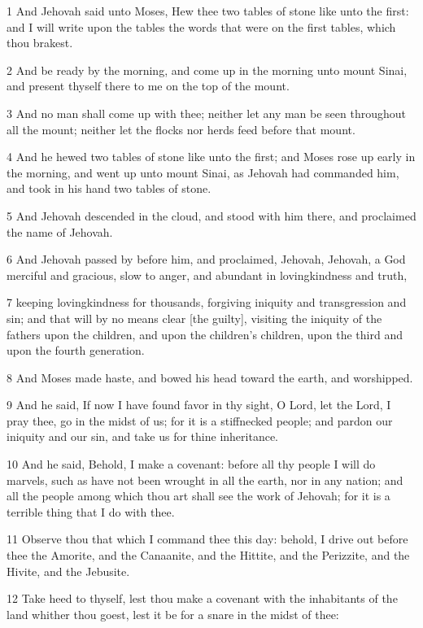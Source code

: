 \par 1 And Jehovah said unto Moses, Hew thee two tables of stone like unto the first: and I will write upon the tables the words that were on the first tables, which thou brakest.
\par 2 And be ready by the morning, and come up in the morning unto mount Sinai, and present thyself there to me on the top of the mount.
\par 3 And no man shall come up with thee; neither let any man be seen throughout all the mount; neither let the flocks nor herds feed before that mount.
\par 4 And he hewed two tables of stone like unto the first; and Moses rose up early in the morning, and went up unto mount Sinai, as Jehovah had commanded him, and took in his hand two tables of stone.
\par 5 And Jehovah descended in the cloud, and stood with him there, and proclaimed the name of Jehovah.
\par 6 And Jehovah passed by before him, and proclaimed, Jehovah, Jehovah, a God merciful and gracious, slow to anger, and abundant in lovingkindness and truth,
\par 7 keeping lovingkindness for thousands, forgiving iniquity and transgression and sin; and that will by no means clear [the guilty], visiting the iniquity of the fathers upon the children, and upon the children's children, upon the third and upon the fourth generation.
\par 8 And Moses made haste, and bowed his head toward the earth, and worshipped.
\par 9 And he said, If now I have found favor in thy sight, O Lord, let the Lord, I pray thee, go in the midst of us; for it is a stiffnecked people; and pardon our iniquity and our sin, and take us for thine inheritance.
\par 10 And he said, Behold, I make a covenant: before all thy people I will do marvels, such as have not been wrought in all the earth, nor in any nation; and all the people among which thou art shall see the work of Jehovah; for it is a terrible thing that I do with thee.
\par 11 Observe thou that which I command thee this day: behold, I drive out before thee the Amorite, and the Canaanite, and the Hittite, and the Perizzite, and the Hivite, and the Jebusite.
\par 12 Take heed to thyself, lest thou make a covenant with the inhabitants of the land whither thou goest, lest it be for a snare in the midst of thee:
